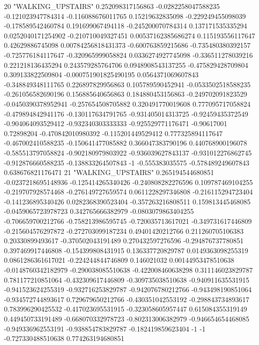 20 "WALKING_UPSTAIRS" 0.252098317156863 -0.0282258047588235 -0.121023947784314 -0.116088676011765 0.15219632835098 -0.229249455098039 -0.178589542460784 0.191699067494118 -0.245200070784314 0.137171535335294 0.0252040171254902 -0.210710049327451 0.00537162385686274 0.115193556117647 0.42629886745098 0.00784256818431373 -0.600763859215686 -0.735480380392157 -0.725776184117647 -0.320965999058824 0.0336274927745098 -0.336511278039216 0.221218136435294 0.243579285764706 0.0948908543137255 -0.475829428709804 0.309133822509804 -0.000751901825490195 0.0564371069607843 -0.348849348111765 0.226897829956863 0.105789590452941 -0.0533502518588235 -0.261056582690196 0.156885640656863 0.184880453156863 -0.249702091823529 -0.0450390378952941 -0.257654508705882 0.320491770019608 0.777095717058824 -0.479894842941176 -0.130117634791765 -0.931405014313725 -0.92459435372549 -0.904064093529412 -0.932340303333333 -0.925529771176471 -0.90617001 0.72898204 -0.470842010980392 -0.115201449529412 0.777325894117647 -0.467002410588235 -0.150641477085882 0.366047383790196 0.440768900196078 -0.585513797058824 -0.902180979803922 -0.936039627843137 -0.931012276862745 -0.912876660588235 -0.138833264507843 -1 -0.555383035575 -0.578489249607843 0.638676821176471
21 "WALKING_UPSTAIRS" 0.265194544680851 -0.0237218695148936 -0.125414265340426 -0.240808282276596 0.109787469104255 -0.219707928574468 -0.276149727659574 0.0611228297346808 -0.216115294723404 -0.141236895340426 0.0282368390523404 -0.357263216808511 0.159813445468085 -0.0459065723978723 0.342765666382979 -0.0803079863404255 -0.706659700212766 -0.758213986595745 -0.720035713617021 -0.349731617446809 -0.215604576297872 -0.272703099187234 0.49401420212766 0.211260705106383 0.20330899493617 -0.370502043191489 0.270432597276596 -0.294876737780851 0.397469917446808 -0.154399808431915 0.136337720829787 0.0149363098255319 0.0861286361617021 -0.224244844746809 0.146021032 0.00144953478510638 -0.0148760342182979 -0.290038085510638 -0.422008460638298 0.311146023829787 0.781177210851064 -0.432309617446809 -0.309735038510638 -0.940911635531915 -0.941523624255319 -0.932716253829787 -0.942076780212766 -0.943498190851064 -0.934572744893617 0.729679650212766 -0.430351042553192 -0.298843734893617 0.783996290425532 -0.417023695531915 -0.323058605957447 0.615084355319149 0.449450733191489 -0.668070332978723 -0.802313006382979 -0.946654654468085 -0.949336962553191 -0.938854783829787 -0.182419859623404 -1 -1 -0.727330488510638 0.774263194680851
